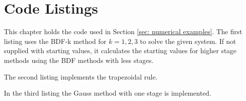 \appendix

\section*{Code Listings}
	\label{sec:Code listings}
	This chapter holds the code used in Section \ref{sec: numerical examples}. The first listing uses the BDF-k method for $k=1,2,3$ to solve the given system. If not supplied with starting values, it calculates the starting values for higher stage methods using the BDF methods with less stages.
	
	
	\newpage
	
	The second listing implements the trapezoidal rule.
	
	\newpage
	
	In the third listing the Gauss method with one stage is implemented.
	